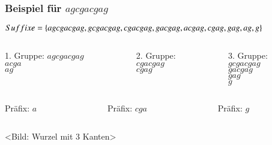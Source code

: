 \documentclass{beamer}
\begin{document}
\begin{frame}[t]
\frametitle{Beispiel für $agcgacgag$}
$Suffixe = \{agcgacgag, gcgacgag, cgacgag, gacgag, acgag, cgag, \newline gag, ag, g\}$
\medskip
\begin{columns}
    \begin{column}[t]{0.3\textwidth}
        1. Gruppe:  
        $agcgacgag$  \\
        $acga$      \\  
        $ag$         \\ 
    \end{column}
    \begin{column}[t]{0.3\textwidth}
        2. Gruppe:        \\
        $cgacgag$   \\
        $cgag$         \\
    \end{column}
    \begin{column}[t]{0.3\textwidth}
        3. Gruppe:      \\
        $gcgacgag$ \\
        $gacgag$     \\
        $gag$           \\
        $g$               \\
    \end{column}
\end{columns}
\medskip
\begin{columns}
    \begin{column}[t]{0.3\textwidth}
        Präfix: $a$
    \end{column}
    \begin{column}[t]{0.3\textwidth}
        Präfix: $cga$
    \end{column}
    \begin{column}[t]{0.3\textwidth}
        Präfix: $g$
    \end{column}
\end{columns}
\medskip
<Bild: Wurzel mit 3 Kanten>
\end{frame}
\end{document}
